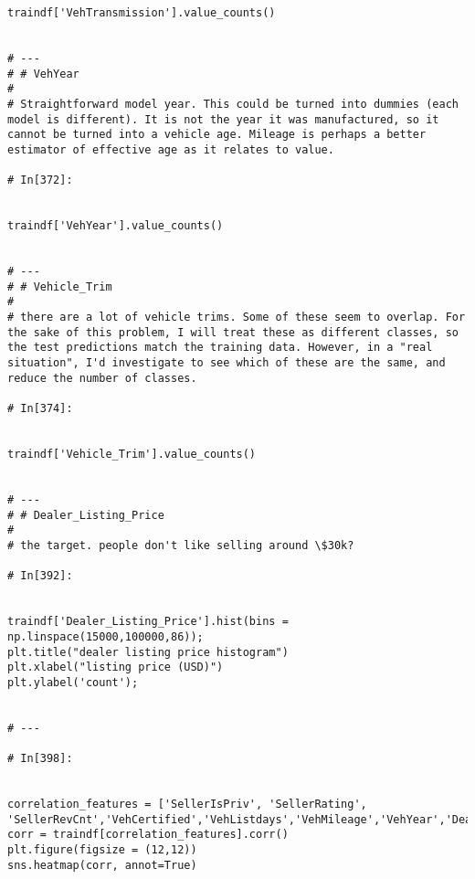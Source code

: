 \begin{verbatim}
traindf['VehTransmission'].value_counts()


# ---
# # VehYear
# 
# Straightforward model year. This could be turned into dummies (each model is different). It is not the year it was manufactured, so it cannot be turned into a vehicle age. Mileage is perhaps a better estimator of effective age as it relates to value.

# In[372]:


traindf['VehYear'].value_counts()


# ---
# # Vehicle_Trim
# 
# there are a lot of vehicle trims. Some of these seem to overlap. For the sake of this problem, I will treat these as different classes, so the test predictions match the training data. However, in a "real situation", I'd investigate to see which of these are the same, and reduce the number of classes. 

# In[374]:


traindf['Vehicle_Trim'].value_counts()


# ---
# # Dealer_Listing_Price
# 
# the target. people don't like selling around \$30k?

# In[392]:


traindf['Dealer_Listing_Price'].hist(bins = np.linspace(15000,100000,86));
plt.title("dealer listing price histogram")
plt.xlabel("listing price (USD)")
plt.ylabel('count');


# ---

# In[398]:


correlation_features = ['SellerIsPriv', 'SellerRating', 'SellerRevCnt','VehCertified','VehListdays','VehMileage','VehYear','Dealer_Listing_Price']
corr = traindf[correlation_features].corr()
plt.figure(figsize = (12,12))
sns.heatmap(corr, annot=True)
\end{verbatim}

